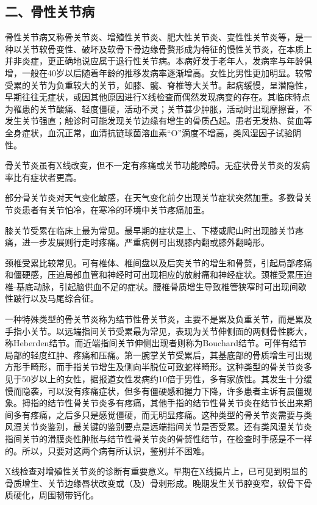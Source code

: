 \subsection{二、骨性关节病}

骨性关节病又称骨关节炎、增殖性关节炎、肥大性关节炎、变性性关节炎等，是一种以关节软骨变性、破坏及软骨下骨边缘骨赘形成为特征的慢性关节炎，在本质上并非炎症，更正确地说应属于退行性关节病。本病好发于老年人，发病率与年龄俱增，一般在40岁以后随着年龄的推移发病率逐渐增高。女性比男性更加明显。较常受累的关节为负重较大的关节，如膝、髋、脊椎等大关节。起病缓慢，呈潜隐性，早期往往无症状，或因其他原因进行X线检查而偶然发现病变的存在。其临床特点为罹患的关节酸痛、轻度僵硬，活动不灵；关节甚少肿胀，活动时出现摩擦音，不发生关节强直；触诊时可能发现关节边缘有增生的骨质凸起。患者无发热、贫血等全身症状，血沉正常，血清抗链球菌溶血素“O”滴度不增高，类风湿因子试验阴性。

骨关节炎虽有X线改变，但不一定有疼痛或关节功能障碍。无症状骨关节炎的发病率比有症状者更高。

部分骨关节炎对天气变化敏感，在天气变化前夕出现关节症状突然加重。多数骨关节炎患者有关节怕冷，在寒冷的环境中关节疼痛加重。

膝关节受累在临床上最为常见。最早期的症状是上、下楼或爬山时出现膝关节疼痛，进一步发展则行走时疼痛。严重病例可出现膝内翻或膝外翻畸形。

颈椎受累比较常见。可有椎体、椎间盘以及后突关节的增生和骨赘，引起局部疼痛和僵硬感，压迫局部血管和神经时可出现相应的放射痛和神经症状。颈椎受累压迫椎-基底动脉，引起脑供血不足的症状。腰椎骨质增生导致椎管狭窄时可出现间歇性跛行以及马尾综合征。

一种特殊类型的骨关节炎称为结节性骨关节炎，主要不是累及负重关节，而是累及手指小关节。以远端指间关节受累最为常见，表现为关节伸侧面的两侧骨性膨大，称Heberden结节。而近端指间关节伸侧出现者则称为Bouchard结节。可伴有结节局部的轻度红肿、疼痛和压痛。第一腕掌关节受累后，其基底部的骨质增生可出现方形手畸形，而手指关节增生及侧向半脱位可致蛇样畸形。这种类型的骨关节炎多见于50岁以上的女性，据报道女性发病约10倍于男性，多有家族性。其发生十分缓慢而隐袭，可以没有疼痛症状，但多有僵硬感和握力下降，许多患者主诉有晨僵现象。拇指的结节性骨关节炎多有疼痛，其他手指的结节性骨关节炎在结节长出来期间多有疼痛，之后多只是感觉僵硬，而无明显疼痛。这种类型的骨关节炎需要与类风湿关节炎鉴别，最关键的鉴别要点是远端指间关节是否受累。还有类风湿关节炎指间关节的滑膜炎性肿胀与结节性骨关节炎的骨赘性结节，在检查时手感是不一样的。所以，只要对这两个病有所认识，鉴别并不困难。

X线检查对增殖性关节炎的诊断有重要意义。早期在X线摄片上，已可见到明显的骨质增生、关节边缘唇状改变或（及）骨刺形成。晚期发生关节腔变窄，软骨下骨质硬化，周围韧带钙化。

